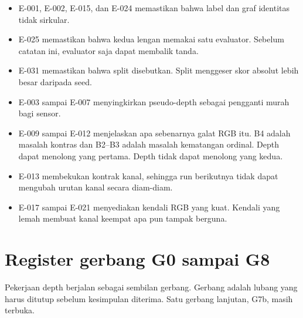 \documentclass[preprint,12pt]{elsarticle}
\newcommand{\E}[1]{E-#1}
\newcommand{\G}[1]{G#1}
\begin{document}
\begin{itemize}
\item \E{001}, \E{002}, \E{015}, dan \E{024} memastikan bahwa label dan graf
identitas tidak sirkular.
\item \E{025} memastikan bahwa kedua lengan memakai satu evaluator. Sebelum
catatan ini, evaluator saja dapat membalik tanda.
\item \E{031} memastikan bahwa split disebutkan. Split menggeser skor absolut
lebih besar daripada seed.
\item \E{003} sampai \E{007} menyingkirkan pseudo-depth sebagai pengganti murah
bagi sensor.
\item \E{009} sampai \E{012} menjelaskan apa sebenarnya galat RGB itu. B4
adalah masalah kontras dan B2--B3 adalah masalah kematangan ordinal. Depth
dapat menolong yang pertama. Depth tidak dapat menolong yang kedua.
\item \E{013} membekukan kontrak kanal, sehingga run berikutnya tidak dapat
mengubah urutan kanal secara diam-diam.
\item \E{017} sampai \E{021} menyediakan kendali RGB yang kuat. Kendali yang
lemah membuat kanal keempat apa pun tampak berguna.
\end{itemize}

\section{Register gerbang \G{0} sampai \G{8}}
\label{sec:gates}

Pekerjaan depth berjalan sebagai sembilan gerbang. Gerbang adalah lubang yang
harus ditutup sebelum kesimpulan diterima. Satu gerbang lanjutan, \G{7b}, masih
terbuka.
\end{document}
